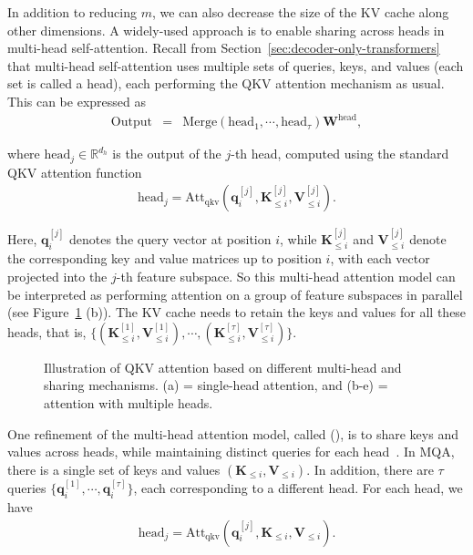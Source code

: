 In addition to reducing $m$, we can also decrease the size of the KV cache along other dimensions. A widely-used approach is to enable sharing across heads in multi-head self-attention. Recall from Section~\ref{sec:decoder-only-transformers} that multi-head self-attention uses multiple sets of queries, keys, and values (each set is called a head), each performing the QKV attention mechanism as usual. This can be expressed as
\begin{eqnarray}
\mathrm{Output} & = & \mathrm{Merge}(\mathrm{head}_1,\cdots,\mathrm{head}_{\tau}) \mathbf{W}^{\mathrm{head}},
\end{eqnarray}

\noindent where $\mathrm{head}_j \in \mathbb{R}^{d_h}$ is the output of the $j$-th head, computed using the standard QKV attention function
\begin{eqnarray}
\mathrm{head}_j = \mathrm{Att}_{\mathrm{qkv}}(\mathbf{q}_{i}^{[j]},\mathbf{K}_{\le i}^{[j]},\mathbf{V}_{\le i}^{[j]}).
\end{eqnarray}

Here, $\mathbf{q}_{i}^{[j]}$ denotes the query vector at position $i$, while
$\mathbf{K}_{\le i}^{[j]}$ and $\mathbf{V}_{\le i}^{[j]}$ denote the corresponding
key and value matrices up to position $i$, with each vector projected into the $j$-th feature subspace. So this multi-head attention model can be interpreted as performing attention on a group of feature subspaces in parallel (see Figure~\ref{fig:comparison-of-multihead-attention-models} (b)). The KV cache needs to retain the keys and values for all these heads, that is, $\{(\mathbf{K}_{\le i}^{[1]},\mathbf{V}_{\le i}^{[1]}),\cdots,(\mathbf{K}_{\le i}^{[\tau]},\mathbf{V}_{\le i}^{[\tau]})\}$.

\begin{figure}[!t]
\centering

\caption{Illustration of QKV attention based on different multi-head and sharing mechanisms. (a) = single-head attention, and (b-e) = attention with multiple heads.}
\label{fig:comparison-of-multihead-attention-models}
\end{figure}

One refinement of the multi-head attention model, called  (), is to share keys and values across heads, while maintaining distinct queries for each head~\cite{shazeer:2019fast}. In MQA, there is a single set of keys and values $(\mathbf{K}_{\le i}, \mathbf{V}_{\le i})$. In addition, there are $\tau$ queries $\{\mathbf{q}_{i}^{[1]},\cdots,\mathbf{q}_{i}^{[\tau]}\}$, each corresponding to a different head. For each head, we have
\begin{eqnarray}
\mathrm{head}_j = \mathrm{Att}_{\mathrm{qkv}}(\mathbf{q}_{i}^{[j]},\mathbf{K}_{\le i},\mathbf{V}_{\le i}).
\end{eqnarray}


